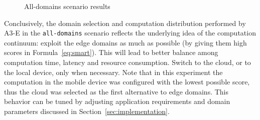 \begin{figure}[htb]
	\raggedright

	\captionsetup[subfigure]{width=0.45\textwidth}
	\captionsetup[subfigure]{width=0.45\textwidth}
	
	\caption{All-domains scenario results} \label{fig:all-domains}
\end{figure}

Conclusively, the domain selection and computation distribution performed by A3-E in the \texttt{all-domains} scenario reflects the underlying idea of the computation continuum: exploit the edge domains as much as possible (by giving them high scores in Formula~\ref{eq:smart}). This will lead to better balance among computation time, latency and resource consumption. Switch to the cloud, or to the local device, only when necessary. Note that in this experiment the computation in the mobile device was configured with the lowest possible score, thus the cloud was selected as the first alternative to edge domains. This behavior can be tuned by adjusting application requirements and domain parameters discussed in Section~\ref{sec:implementation}.





